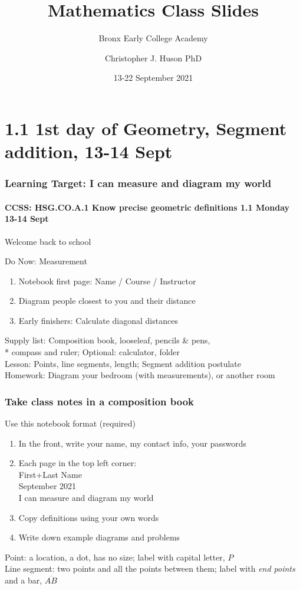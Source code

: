 \documentclass{beamer}
\title{Mathematics Class Slides}
\subtitle{Bronx Early College Academy}
\author{Christopher J. Huson PhD}
\date{13-22 September 2021}
\begin{document}
\frame{\titlepage}
\section[Outline]{}
\frame{\tableofcontents}

\section{1.1 1st day of Geometry, Segment addition, 13-14 Sept}
\frame
{
  \frametitle{Learning Target: I can measure and diagram my world}
  \framesubtitle{CCSS: HSG.CO.A.1 Know precise geometric definitions \hfill \alert{1.1 Monday 13-14 Sept}}

  Welcome back to school
  \begin{block}{Do Now: Measurement}
  \begin{enumerate}
      \item Notebook first page: Name / Course / Instructor
      \item Diagram people closest to you and their distance
      \item Early finishers: Calculate diagonal distances
  \end{enumerate}
  \end{block}
  Supply list: Composition book, looseleaf, pencils \& pens, \\*
  compass and ruler; Optional: calculator, folder \\[0.25cm]
  Lesson: Points, line segments, length; Segment addition postulate \\[0.25cm]
  Homework: Diagram your bedroom (with measurements), or another room
}

  \frame
  {
    \frametitle{Take class notes in a composition book}
    \begin{block}{Use this notebook format (required)}
      \begin{enumerate}
        \item In the front, write your name, my contact info, your passwords
        \item Each page in the top left corner: \\ \qquad First+Last Name \\
         September 2021 \\  I can measure and diagram my world \vspace{0.25cm}
        \item Copy definitions using your own words
        \item Write down example diagrams and problems
      \end{enumerate}
      \end{block}
    Point: a location, a dot, has no size; label with capital letter, $P$ \\[0.25cm]
    Line segment: two points and all the points between them; label with \emph{end points} and a bar, $\overline{AB}$ \\
  }
\end{document}
